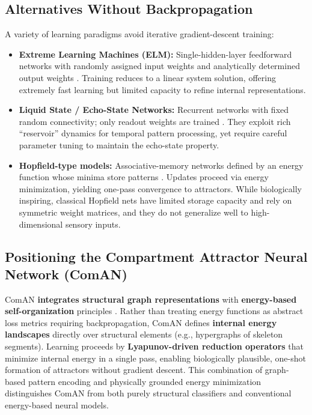 \documentclass[12pt, a4paper]{article}
\begin{document}
\subsection*{Alternatives Without Backpropagation}

A variety of learning paradigms avoid iterative gradient-descent training:

\begin{itemize}
\item \textbf{Extreme Learning Machines (ELM):} Single-hidden-layer feedforward networks with randomly assigned input weights and analytically determined output weights \cite{huang2006}. Training reduces to a linear system solution, offering extremely fast learning but limited capacity to refine internal representations.

\item \textbf{Liquid State / Echo-State Networks:} Recurrent networks with fixed random connectivity; only readout weights are trained \cite{jaeger2001}. They exploit rich ``reservoir'' dynamics for temporal pattern processing, yet require careful parameter tuning to maintain the echo-state property.

\item \textbf{Hopfield-type models:} Associative-memory networks defined by an energy function whose minima store patterns \cite{hopfield1982}. Updates proceed via energy minimization, yielding one-pass convergence to attractors. While biologically inspiring, classical Hopfield nets have limited storage capacity and rely on symmetric weight matrices, and they do not generalize well to high-dimensional sensory inputs.
\end{itemize}

\subsection*{Positioning the Compartment Attractor Neural Network (ComAN)}

ComAN \textbf{integrates structural graph representations} with \textbf{energy-based self-organization} principles \cite{parzhin2025}. Rather than treating energy functions as abstract loss metrics requiring backpropagation, ComAN defines \textbf{internal energy landscapes} directly over structural elements (e.g., hypergraphs of skeleton segments). Learning proceeds by \textbf{Lyapunov-driven reduction operators} that minimize internal energy in a single pass, enabling biologically plausible, one-shot formation of attractors without gradient descent. This combination of graph-based pattern encoding and physically grounded energy minimization distinguishes ComAN from both purely structural classifiers and conventional energy-based neural models.
\end{document}

